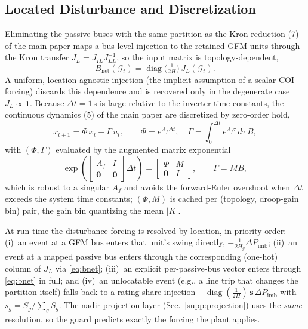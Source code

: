 \documentclass[lettersize,journal]{IEEEtran}
\begin{document}
\subsection{Located Disturbance and Discretization}
Eliminating the passive buses with the same partition as the Kron reduction (7) of the main paper maps a bus-level injection to the retained GFM units through the Kron transfer $J_L=J_{IL}J_{LL}^{-1}$, so the input matrix is topology-dependent,
\begin{equation}
  B_{\mathrm{net}}(\mathcal{G}_t)=\operatorname{diag}\!\big(\tfrac{1}{2H}\big)\,J_L(\mathcal{G}_t).
  \label{eq:bnet}
\end{equation}
A uniform, location-agnostic injection (the implicit assumption of a scalar-COI forcing) discards this dependence and is recovered only in the degenerate case $J_L\!\propto\!\mathbf{1}$. Because $\Delta t=1$\,s is large relative to the inverter time constants, the continuous dynamics (5) of the main paper are discretized by zero-order hold,
\begin{equation}
  x_{t+1}=\Phi\,x_t+\Gamma\,u_t,\qquad
  \Phi=e^{A_f\Delta t},\quad
  \Gamma=\!\int_0^{\Delta t}\! e^{A_f\tau}\,d\tau\,B,
  \label{eq:zoh}
\end{equation}
with $(\Phi,\Gamma)$ evaluated by the augmented matrix exponential
\begin{equation}
  \exp\!\left(
  \begin{bmatrix} A_f & I\\ \mathbf 0 & \mathbf 0\end{bmatrix}\Delta t\right)
  =\begin{bmatrix} \Phi & M\\ \mathbf 0 & I\end{bmatrix},
  \qquad \Gamma = M B,
  \label{eq:augexp}
\end{equation}
which is robust to a singular $A_f$ and avoids the forward-Euler overshoot when $\Delta t$ exceeds the system time constants; $(\Phi,M)$ is cached per (topology, droop-gain bin) pair, the gain bin quantizing the mean $|K|$.

At run time the disturbance forcing is resolved by location, in priority order: (i)~an event at a GFM bus enters that unit's swing directly, $-\tfrac{1}{2H_g}\Delta P_{\mathrm{imb}}$; (ii)~an event at a mapped passive bus enters through the corresponding (one-hot) column of $J_L$ via \eqref{eq:bnet}; (iii)~an explicit per-passive-bus vector enters through \eqref{eq:bnet} in full; and (iv)~an unlocatable event (e.g., a line trip that changes the partition itself) falls back to a rating-share injection $-\operatorname{diag}(\tfrac{1}{2H})\,\mathbf s\,\Delta P_{\mathrm{imb}}$ with $s_g=S_g/\sum_g S_g$. The nadir-projection layer (Sec.~\ref{supp:projection}) uses the \emph{same} resolution, so the guard predicts exactly the forcing the plant applies.
\end{document}
